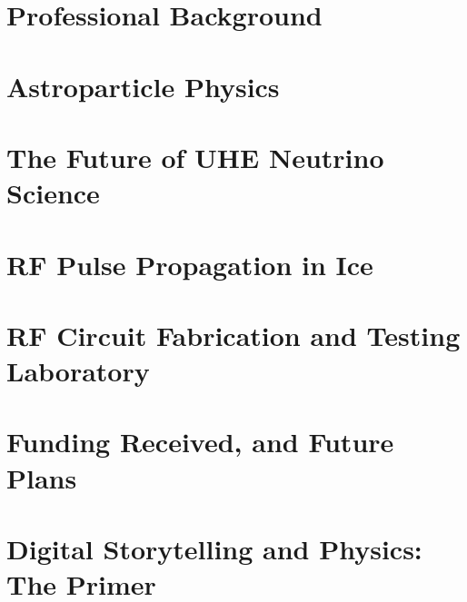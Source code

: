\documentclass[../main.tex]{subfiles}
\begin{document}
\section{Professional Background}

\begin{flushleft}

\end{flushleft}

\section{Astroparticle Physics}

\begin{flushleft}

\end{flushleft}

\section{The Future of UHE Neutrino Science}

\begin{flushleft}

\end{flushleft}

\section{RF Pulse Propagation in Ice}

\begin{flushleft}

\end{flushleft}

\section{RF Circuit Fabrication and Testing Laboratory}
\label{sec:schol}

\begin{flushleft}

\end{flushleft}

\section{Funding Received, and Future Plans}

\begin{flushleft}

\end{flushleft}

\section{Digital Storytelling and Physics: The Primer}

\begin{flushleft}

\end{flushleft}
\end{document}
